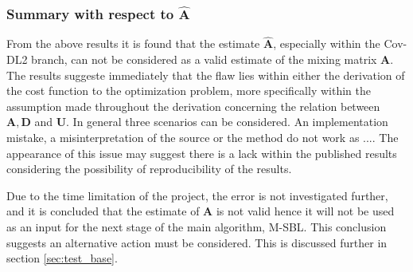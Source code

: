 \subsubsection{Summary with respect to $\hat{\mathbf{A}}$}
From the above results it is found that the estimate $\hat{\mathbf{A}}$, especially within the Cov-DL2 branch, can not be considered as a valid estimate of the mixing matrix $\mathbf{A}$. 
The results suggeste immediately that the flaw lies within either the derivation of the cost function to the optimization problem, more specifically within the assumption made throughout the derivation concerning the relation between $\mathbf{A}, \mathbf{D}$ and $\mathbf{U}$. 
In general three scenarios can be considered. An implementation mistake, a misinterpretation of the source \cite{Balkan2015} or the method do not work as ....
The appearance of this issue may suggest there is a lack within the published results \cite{Balkan2015} considering the possibility of reproducibility of the results. 

Due to the time limitation of the project, the error is not investigated further, and it is concluded that the estimate of $\mathbf{A}$ is not valid hence it will not be used as an input for the next stage of the main algorithm, M-SBL. This conclusion suggests an alternative action must be considered. This is discussed further in section \ref{sec:test_base}.


